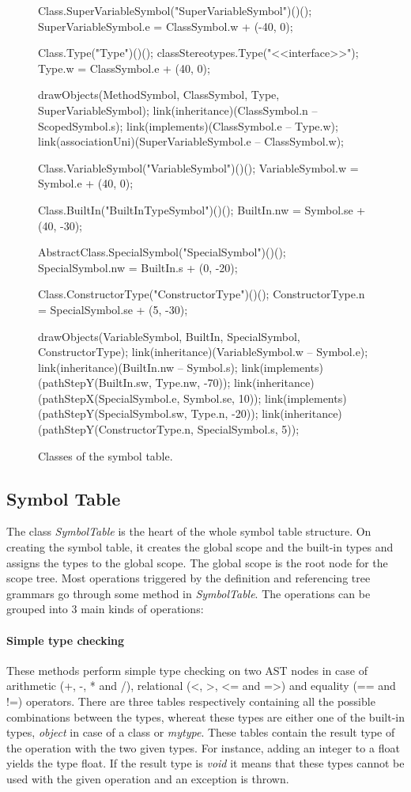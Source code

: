 \begin{figure}[H]
\begin{emp}[classdiag]
	Class.SuperVariableSymbol("SuperVariableSymbol")()();
	SuperVariableSymbol.e = ClassSymbol.w + (-40, 0);

	Class.Type("Type")()();
	classStereotypes.Type("<<interface>>");
	Type.w = ClassSymbol.e + (40, 0);

	drawObjects(MethodSymbol, ClassSymbol, Type, SuperVariableSymbol);
	link(inheritance)(ClassSymbol.n -- ScopedSymbol.s);
	link(implements)(ClassSymbol.e -- Type.w);
	link(associationUni)(SuperVariableSymbol.e -- ClassSymbol.w);


	Class.VariableSymbol("VariableSymbol")()();
	VariableSymbol.w = Symbol.e + (40, 0);

	Class.BuiltIn("BuiltInTypeSymbol")()();
	BuiltIn.nw = Symbol.se + (40, -30);

	AbstractClass.SpecialSymbol("SpecialSymbol")()();
	SpecialSymbol.nw = BuiltIn.s + (0, -20);

	Class.ConstructorType("ConstructorType")()();
	ConstructorType.n = SpecialSymbol.se + (5, -30);

	drawObjects(VariableSymbol, BuiltIn, SpecialSymbol, ConstructorType);
	link(inheritance)(VariableSymbol.w -- Symbol.e);
	link(inheritance)(BuiltIn.nw -- Symbol.s);
	link(implements)(pathStepY(BuiltIn.sw, Type.nw, -70));
	link(inheritance)(pathStepX(SpecialSymbol.e, Symbol.se, 10));
	link(implements)(pathStepY(SpecialSymbol.sw, Type.n, -20));
	link(inheritance)(pathStepY(ConstructorType.n, SpecialSymbol.s, 5));

	\end{emp}
	\caption{Classes of the symbol table.}
	\label{fig:classes}
\end{figure}

\subsection{Symbol Table}
\label{sec:symbolTableDescription}

The class \emph{SymbolTable} is the heart of the whole symbol table structure.
On creating the symbol table, it creates the global scope and the built-in
types and assigns the types to the global scope. The global scope is the root
node for the scope tree. Most operations triggered by the definition and
referencing tree grammars go through some method in \emph{SymbolTable}.
The operations can be grouped into 3 main kinds of operations:

\paragraph{Simple type checking}
These methods perform simple type checking on two AST nodes in case of
arithmetic (+, -, * and /), relational (<, >, <= and =>) and equality (== and !=) operators.
There are three tables respectively containing all the possible combinations
between the types, whereat these types are either one of the built-in types,
\emph{object} in case of a class or \emph{mytype}. These tables contain the
result type of the operation with the two given types. For instance, adding
an integer to a float yields the type float. If the result type
is \emph{void} it means that these types cannot be used with the given
operation and an exception is thrown.

